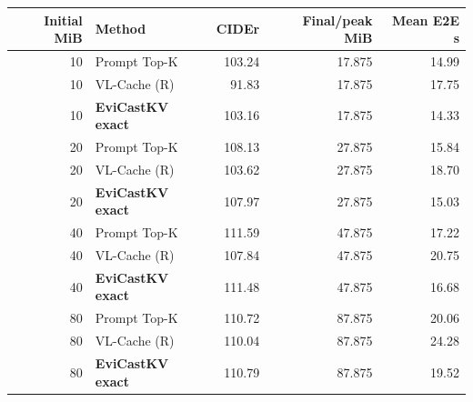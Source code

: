 \begin{tabular}{rlrrr}
\toprule
Initial MiB & Method & CIDEr & Final/peak MiB & Mean E2E s\\\midrule
10 & Prompt Top-K & 103.24 & 17.875 & 14.99\\
10 & VL-Cache (R) & 91.83 & 17.875 & 17.75\\
10 & \textbf{EviCastKV exact} & 103.16 & 17.875 & 14.33\\
20 & Prompt Top-K & 108.13 & 27.875 & 15.84\\
20 & VL-Cache (R) & 103.62 & 27.875 & 18.70\\
20 & \textbf{EviCastKV exact} & 107.97 & 27.875 & 15.03\\
40 & Prompt Top-K & 111.59 & 47.875 & 17.22\\
40 & VL-Cache (R) & 107.84 & 47.875 & 20.75\\
40 & \textbf{EviCastKV exact} & 111.48 & 47.875 & 16.68\\
80 & Prompt Top-K & 110.72 & 87.875 & 20.06\\
80 & VL-Cache (R) & 110.04 & 87.875 & 24.28\\
80 & \textbf{EviCastKV exact} & 110.79 & 87.875 & 19.52\\
\bottomrule
\end{tabular}
